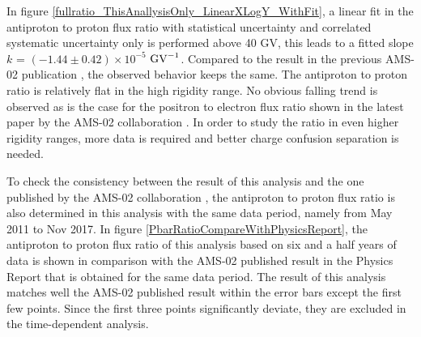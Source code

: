 In figure \ref{fullratio_ThisAnallysisOnly_LinearXLogY_WithFit}, a linear fit in the antiproton to proton flux ratio with statistical uncertainty and correlated systematic uncertainty only is performed above 40 GV, this leads to a fitted slope $k$ = $(-1.44\pm0.42)\times10^{-5}$ $\rm{GV}^{-1}$. Compared to the result in the previous AMS-02 publication \cite{AMS02AntiprotonPRL2016}, the observed behavior keeps the same. The antiproton to proton ratio is relatively flat in the high rigidity range. No obvious falling trend is observed as is the case for the positron to electron flux ratio shown in the latest paper by the AMS-02 collaboration \cite{PhysicsReport2}. In order to study the ratio in even higher rigidity ranges, more data is required and better charge confusion separation is needed. \par 


To check the consistency between the result of this analysis and the one published by the AMS-02 collaboration \cite{PhysicsReport2}, the antiproton to proton flux ratio is also determined in this analysis with the same data period, namely from May 2011 to Nov 2017. In figure \ref{PbarRatioCompareWithPhysicsReport}, the antiproton to proton flux ratio of this analysis based on six and a half years of data is shown in comparison with the AMS-02 published result in the Physics Report that is obtained for the same data period. The result of this analysis matches well the AMS-02 published result within the error bars except the first few points. Since the first three points significantly deviate, they are excluded in the time-dependent analysis. 

